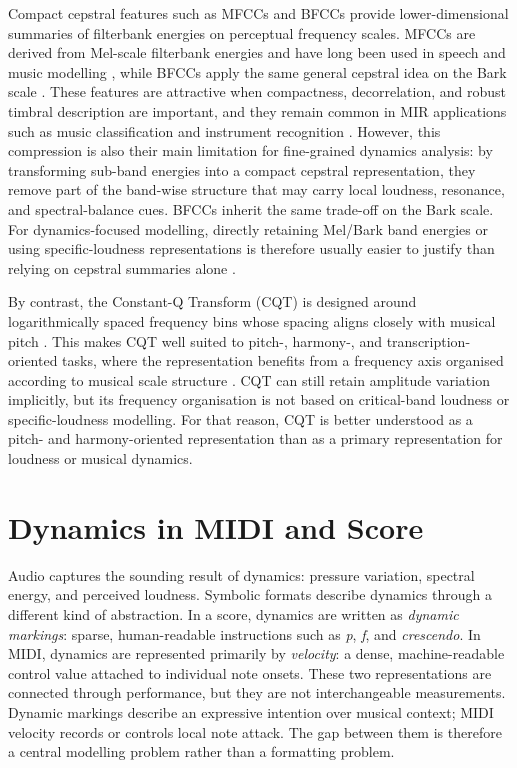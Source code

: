 Compact cepstral features such as MFCCs and BFCCs provide lower-dimensional summaries of filterbank energies on perceptual frequency scales. MFCCs are derived from Mel-scale filterbank energies and have long been used in speech and music modelling \cite{davis1980comparison,logan2000mel}, while BFCCs apply the same general cepstral idea on the Bark scale \cite{herrera2010bfcc}. These features are attractive when compactness, decorrelation, and robust timbral description are important, and they remain common in MIR applications such as music classification and instrument recognition \cite{fu2011survey,panda2023audiofeatures,chen2024interpreting}. However, this compression is also their main limitation for fine-grained dynamics analysis: by transforming sub-band energies into a compact cepstral representation, they remove part of the band-wise structure that may carry local loudness, resonance, and spectral-balance cues. BFCCs inherit the same trade-off on the Bark scale. For dynamics-focused modelling, directly retaining Mel/Bark band energies or using specific-loudness representations is therefore usually easier to justify than relying on cepstral summaries alone \cite{mcloughlin2026spectrogramfeatures,narang2024automatic,he2026dynest}.

By contrast, the Constant-Q Transform (CQT) is designed around logarithmically spaced frequency bins whose spacing aligns closely with musical pitch \cite{brown1991constantq}. This makes CQT well suited to pitch-, harmony-, and transcription-oriented tasks, where the representation benefits from a frequency axis organised according to musical scale structure \cite{cheuk2020impact,mcloughlin2026spectrogramfeatures}. CQT can still retain amplitude variation implicitly, but its frequency organisation is not based on critical-band loudness or specific-loudness modelling. For that reason, CQT is better understood as a pitch- and harmony-oriented representation than as a primary representation for loudness or musical dynamics. 


\section{Dynamics in MIDI and Score}
\label{sec:bg:dynamics_midi_score}

Audio captures the sounding result of dynamics: pressure variation, spectral energy, and perceived loudness. Symbolic formats describe dynamics through a different kind of abstraction. In a score, dynamics are written as \emph{dynamic markings}: sparse, human-readable instructions such as \textit{p}, \textit{f}, and \textit{crescendo}. In MIDI, dynamics are represented primarily by \emph{velocity}: a dense, machine-readable control value attached to individual note onsets. These two representations are connected through performance, but they are not interchangeable measurements. Dynamic markings describe an expressive intention over musical context; MIDI velocity records or controls local note attack. The gap between them is therefore a central modelling problem rather than a formatting problem.


